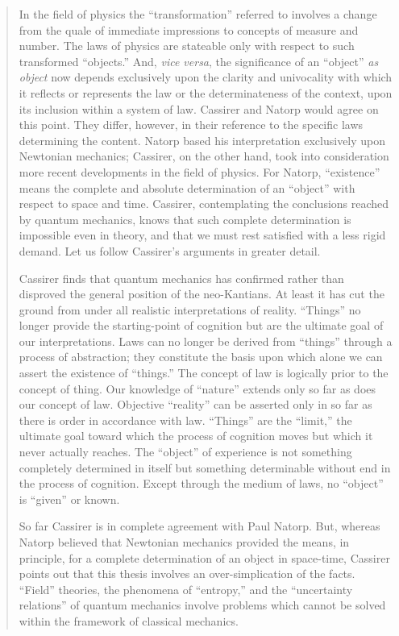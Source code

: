 \documentclass{article}
\begin{document}
\begin{quote}
    In the field of physics the ``transformation'' referred to involves a change from the quale of immediate impressions to concepts of measure and number.  The laws of physics are stateable only with respect to such transformed ``objects.''  And, \emph{vice versa}, the significance of an ``object'' \emph{as object} now depends exclusively upon the clarity and univocality with which it reflects or represents the law or the determinateness of the context, upon its inclusion within a system of law.  Cassirer and Natorp would agree on this point.  They differ, however, in their reference to the specific laws determining the content.  Natorp based his interpretation exclusively upon Newtonian mechanics; Cassirer, on the other hand, took into consideration more recent developments in the field of physics.  For Natorp, ``existence'' means the complete and absolute determination of an ``object'' with respect to space and time.  Cassirer, contemplating the conclusions reached by quantum mechanics, knows that such complete determination is impossible even in theory, and that we must rest satisfied with a less rigid demand.  Let us follow Cassirer's arguments in greater detail.  

    Cassirer finds that quantum mechanics has confirmed rather than disproved the general position of the neo-Kantians.  At least it has cut the ground from under all realistic interpretations of reality.  ``Things'' no longer provide the starting-point of cognition but are the ultimate goal of our interpretations.  Laws can no longer be derived from ``things'' through a process of abstraction; they constitute the basis upon which alone we can assert the existence of ``things.''  The concept of law is logically prior to the concept of thing.  Our knowledge of ``nature'' extends only so far as does our concept of law.  Objective ``reality'' can be asserted only in so far as there is order in accordance with law.  ``Things'' are the ``limit,'' the ultimate goal toward which the process of cognition moves but which it never actually reaches.  The ``object'' of experience is not something completely determined in itself but something determinable without end in the process of cognition.  Except through the medium of laws, no ``object'' is ``given'' or known.

    So far Cassirer is in complete agreement with Paul Natorp.  But, whereas Natorp believed that Newtonian mechanics provided the means, in principle, for a complete determination of an object in space-time, Cassirer points out that this thesis involves an over-simplication of the facts.  ``Field'' theories, the phenomena of ``entropy,'' and the ``uncertainty relations'' of quantum mechanics involve problems which cannot be solved within the framework of classical mechanics.


\end{quote}
\end{document}
